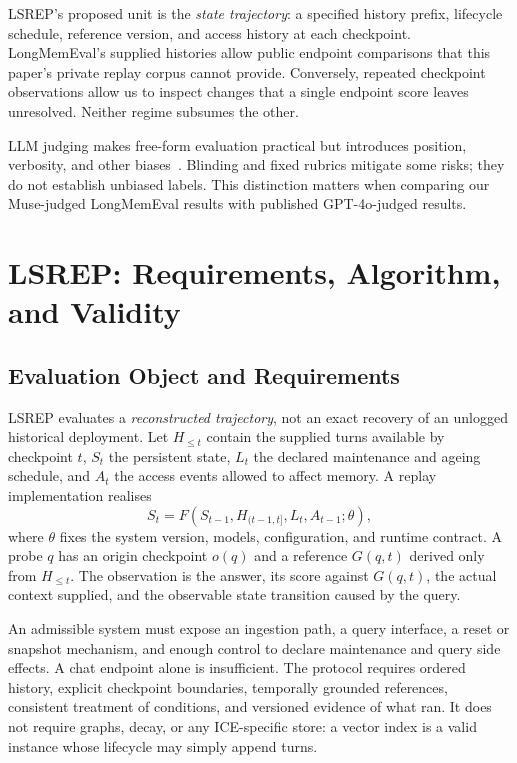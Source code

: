 \documentclass[twoside,11pt]{article}
\begin{document}
LSREP's proposed unit is the \emph{state trajectory}: a specified history prefix, lifecycle schedule, reference version, and access history at each checkpoint. LongMemEval's supplied histories allow public endpoint comparisons that this paper's private replay corpus cannot provide. Conversely, repeated checkpoint observations allow us to inspect changes that a single endpoint score leaves unresolved. Neither regime subsumes the other.

LLM judging makes free-form evaluation practical but introduces position, verbosity, and other biases~\citep{zheng2023judging,liu2023geval,wang2024unfair}. Blinding and fixed rubrics mitigate some risks; they do not establish unbiased labels. This distinction matters when comparing our Muse-judged LongMemEval results with published GPT-4o-judged results.

\section{LSREP: Requirements, Algorithm, and Validity}
\label{sec:exp-design}\label{sec:lsrep}
\subsection{Evaluation Object and Requirements}
LSREP evaluates a \emph{reconstructed trajectory}, not an exact recovery of an unlogged historical deployment. Let $H_{\leq t}$ contain the supplied turns available by checkpoint $t$, $S_t$ the persistent state, $L_t$ the declared maintenance and ageing schedule, and $A_t$ the access events allowed to affect memory. A replay implementation realises
\[
S_t = F(S_{t-1}, H_{(t-1,t]}, L_t, A_{t-1};\theta),
\]
where $\theta$ fixes the system version, models, configuration, and runtime contract. A probe $q$ has an origin checkpoint $o(q)$ and a reference $G(q,t)$ derived only from $H_{\leq t}$. The observation is the answer, its score against $G(q,t)$, the actual context supplied, and the observable state transition caused by the query.

An admissible system must expose an ingestion path, a query interface, a reset or snapshot mechanism, and enough control to declare maintenance and query side effects. A chat endpoint alone is insufficient. The protocol requires ordered history, explicit checkpoint boundaries, temporally grounded references, consistent treatment of conditions, and versioned evidence of what ran. It does not require graphs, decay, or any ICE-specific store: a vector index is a valid instance whose lifecycle may simply append turns.
\end{document}

